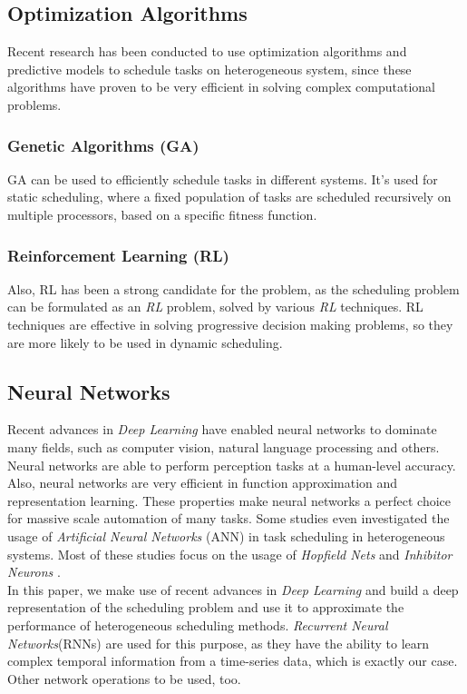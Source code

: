 \documentclass[twocolumn,11pt]{IEEEtran}
\begin{document}
\subsection{Optimization Algorithms}
Recent research has been conducted to use optimization algorithms and predictive models to schedule tasks on heterogeneous system, since these algorithms have proven to be very efficient in solving complex computational problems. 
\subsubsection{Genetic Algorithms (GA)}
GA \cite{article2} can be used to efficiently schedule tasks in different systems. It's used for static scheduling, where a fixed population of tasks are scheduled recursively on multiple processors, based on a specific fitness function.
\subsubsection{Reinforcement Learning (RL)}
Also, RL \cite{ORHEAN2018292} has been a strong candidate for the problem, as the scheduling problem can be formulated as an \emph{RL} problem, solved by various \emph{RL} techniques. RL techniques are effective in solving progressive decision making problems, so they are more likely to be used in dynamic scheduling.

\subsection{Neural Networks}
Recent advances in \emph{Deep Learning} have enabled neural networks to dominate many fields, such as computer vision, natural language processing and others. Neural networks are able to perform perception tasks at a human-level accuracy. Also, neural networks are very efficient in function approximation and representation learning. These properties make neural networks a perfect choice for massive scale automation of many tasks. Some studies even investigated the usage of \emph{Artificial Neural Networks} (ANN)\cite{article3} in task scheduling in heterogeneous systems. Most of these studies focus on the usage of \emph{Hopfield Nets} \cite{sathasivam2008logic} and \emph{Inhibitor Neurons} \cite{article3}. \\

In this paper, we make use of recent advances in \emph{Deep Learning} and build a deep representation of the scheduling problem and use it to approximate the performance of heterogeneous scheduling methods. \emph{Recurrent Neural Networks}(RNNs) \cite{chung2014empirical} are used for this purpose, as they have the ability to learn complex temporal information from a time-series data, which is exactly our case. Other network operations to be used, too.
\end{document}

